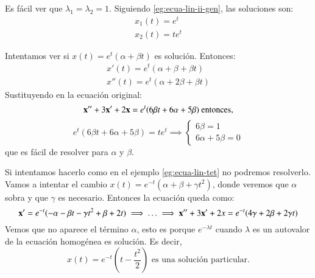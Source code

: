 \begin{eg}[Ecuación lineal de orden 2: $ \mbf{x}'' + 2\mbf{x}' + \mbf{x} = 0 $]
    Es fácil ver que $\lambda_1 = \lambda_2 = 1$. Siguiendo \ref{eg:ecua-lin-ii-gen}, las soluciones son:
    \begin{gather*}
        x_1(t) = e^{ t} \\ x_2(t) = t e^{t}
    \end{gather*}
\end{eg}

\begin{eg}[Ecuación lineal de orden 2: $\mbf{x}''+3\mbf{x}'+2\mbf{x}=te^t$ ]\label{eg:ecua-lin-tet}
    Intentamos ver si $x(t) = e^t(\alpha + \beta t)$ es solución. Entonces:
    \begin{gather*}
        x'(t) = e^{ t}(\alpha + \beta + \beta t) \\ x''(t) = e^t (\alpha + 2\beta + \beta t)
    \end{gather*}
    Sustituyendo en la ecuación original:
    $$
        \mathbf{x}''+3\mathbf{x}'+2\mathbf{x} = e^t (6 \beta t + 6 \alpha + 5 \beta) \text{ entonces,}
    $$
    $$
        e^t (6 \beta t + 6 \alpha + 5 \beta) = te^t \implies \begin{cases}
            6\beta = 1\\
            6\alpha + 5\beta = 0
    \end{cases}
    $$ que es fácil de resolver para $\alpha$ y $\beta$.
\end{eg}
\begin{eg}[Ecuación lineal de orden 2: $\mbf{x}''+3\mbf{x}'+2\mbf{x}=te^{-t}$ ]
    Si intentamos hacerlo como en el ejemplo \ref{eg:ecua-lin-tet} no podremos resolverlo.\\ Vamos a intentar el cambio $x(t) = e^{-t} (\alpha + \beta + \gamma t^2)$, donde veremos que $\alpha$ sobra y que $\gamma$ es necesario. Entonces la ecuación queda como:
    $$
        \mathbf{x}' = e^{-t} (-\alpha -\beta t - \gamma t^2 + \beta + 2 t) \implies \ldots \implies \mathbf{x}'' + 3\mathbf{x}' + 2x = e^{-t} (4\gamma + 2\beta + 2\gamma t)
    $$
    Vemos que no aparece el término $\alpha$, esto es porque $e^{-\lambda t}$ cuando $\lambda$ es un autovalor de la ecuación homogénea es solución. Es decir,
    $$
        x(t) = e^{-t}(t-\frac{t^2}{2}) \text{ es una solución particular.}
    $$
\end{eg}
